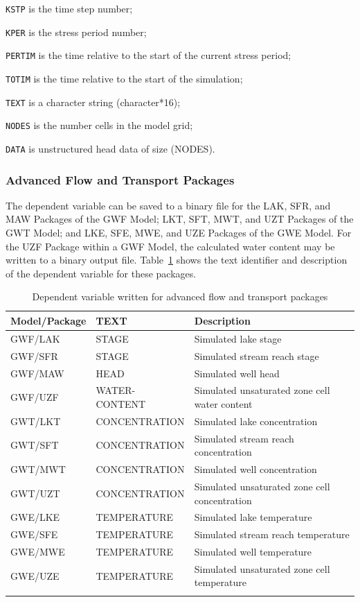 \begin{description} \itemsep0pt \parskip0pt 
\item \texttt{KSTP} is the time step number;
\item \texttt{KPER} is the stress period number;
\item \texttt{PERTIM} is the time relative to the start of the current stress period; 
\item \texttt{TOTIM} is the time relative to the start of the simulation;
\item \texttt{TEXT} is a character string (character*16);
\item \texttt{NODES} is the number cells in the model grid;
\item \texttt{DATA} is unstructured head data of size (NODES).
\end{description}

\newpage
\subsubsection{Advanced Flow and Transport Packages}

\vspace{5mm}
The dependent variable can be saved to a binary file for the LAK, SFR, and MAW Packages of the GWF Model; LKT, SFT, MWT, and UZT Packages of the GWT Model; and LKE, SFE, MWE, and UZE Packages of the GWE Model.  For the UZF Package within a GWF Model, the calculated water content may be written to a binary output file. Table~\ref{table:adpdv} shows the text identifier and description of the dependent variable for these packages.

\begin{longtable}{p{3cm} p{3.5 cm} p{5cm}}
\caption{Dependent variable written for advanced flow and transport packages} 
\tabularnewline
\hline
\textbf{Model/Package} & \textbf{TEXT} & \textbf{Description}  \\
\hline
\endhead
\hline
\endfoot
GWF/LAK & STAGE & Simulated lake stage  \\
GWF/SFR & STAGE & Simulated stream reach stage  \\
GWF/MAW & HEAD & Simulated well head  \\
GWF/UZF & WATER-CONTENT & Simulated unsaturated zone cell water content \\
GWT/LKT & CONCENTRATION & Simulated lake concentration  \\
GWT/SFT & CONCENTRATION & Simulated stream reach concentration  \\
GWT/MWT & CONCENTRATION & Simulated well concentration  \\
GWT/UZT & CONCENTRATION & Simulated unsaturated zone cell concentration  \\
GWE/LKE & TEMPERATURE & Simulated lake temperature  \\
GWE/SFE & TEMPERATURE & Simulated stream reach temperature  \\
GWE/MWE & TEMPERATURE & Simulated well temperature  \\
GWE/UZE & TEMPERATURE & Simulated unsaturated zone cell temperature  \\
\label{table:adpdv}
\end{longtable}



